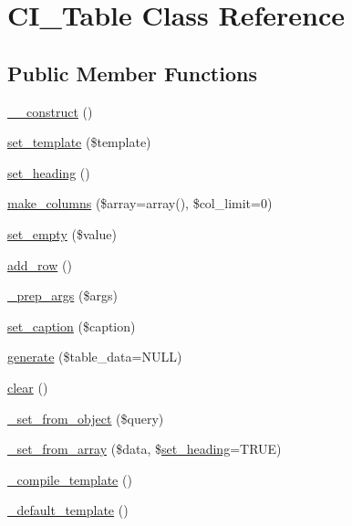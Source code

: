 \hypertarget{class_c_i___table}{\section{C\-I\-\_\-\-Table Class Reference}
\label{class_c_i___table}
}
\subsection*{Public Member Functions}
\begin{DoxyCompactItemize}
\item 
\hyperlink{class_c_i___table_a095c5d389db211932136b53f25f39685}{\-\_\-\-\_\-construct} ()
\item 
\hyperlink{class_c_i___table_ae65d1ab2a626d4ddfda31befc2b347f6}{set\-\_\-template} (\$template)
\item 
\hyperlink{class_c_i___table_ac86a39a681164499633092b44285146e}{set\-\_\-heading} ()
\item 
\hyperlink{class_c_i___table_a816eac03a6a38820918890170fd7e0d0}{make\-\_\-columns} (\$array=array(), \$col\-\_\-limit=0)
\item 
\hyperlink{class_c_i___table_a20b008428100a2b740c02c4bcaa45cf6}{set\-\_\-empty} (\$value)
\item 
\hyperlink{class_c_i___table_ac9e92cea944a5dd37d713eb9d37c0b83}{add\-\_\-row} ()
\item 
\hyperlink{class_c_i___table_aec91c20b757a8a063e4147f0aebe8b1b}{\-\_\-prep\-\_\-args} (\$args)
\item 
\hyperlink{class_c_i___table_ab6146f0f242d4bc75169c8f8e622e979}{set\-\_\-caption} (\$caption)
\item 
\hyperlink{class_c_i___table_ad46f79939e16f261c19157809d56aab8}{generate} (\$table\-\_\-data=N\-U\-L\-L)
\item 
\hyperlink{class_c_i___table_aa821bec12eaa7e0f649397c9675ff505}{clear} ()
\item 
\hyperlink{class_c_i___table_a1bff13b976111abb8943490e71403259}{\-\_\-set\-\_\-from\-\_\-object} (\$query)
\item 
\hyperlink{class_c_i___table_a80451a71925f272d9adde0c4b465f43a}{\-\_\-set\-\_\-from\-\_\-array} (\$data, \$\hyperlink{class_c_i___table_ac86a39a681164499633092b44285146e}{set\-\_\-heading}=T\-R\-U\-E)
\item 
\hyperlink{class_c_i___table_a7f408fd4eecadb5799d5ae004170c4d6}{\-\_\-compile\-\_\-template} ()
\item 
\hyperlink{class_c_i___table_ae1990fcb9ffc455614eeac9a1091f0b0}{\-\_\-default\-\_\-template} ()
\end{DoxyCompactItemize}

